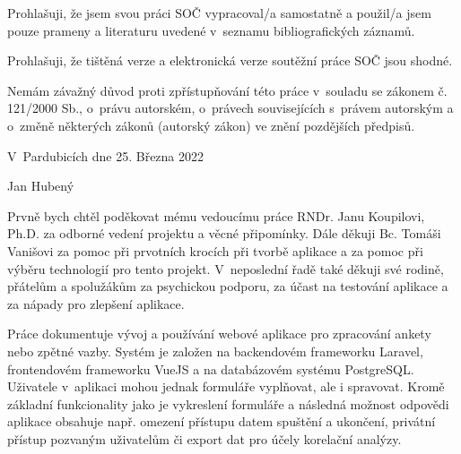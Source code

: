 
\noindent Prohlašuji, že jsem svou práci SOČ vypracoval/a samostatně a použil/a jsem pouze prameny a literaturu uvedené v~seznamu bibliografických záznamů.

\noindent Prohlašuji, že tištěná verze a elektronická verze soutěžní práce SOČ jsou shodné.

\noindent Nemám závažný důvod proti zpřístupňování této práce v~souladu se zákonem č. 121/2000 Sb., o~právu autorském, o~právech souvisejících s~právem autorským a o~změně některých zákonů (autorský zákon) ve znění pozdějších předpisů.  

\vspace{24 pt}

\noindent V~Pardubicích dne 25. Března 2022 \dotfill{} 

\hspace{8.5cm} Jan Hubený

\cleardoublepage

\vspace*{0.8\textheight}

\noindent
Prvně bych chtěl poděkovat mému vedoucímu práce RNDr. Janu Koupilovi, Ph.D. za odborné vedení projektu a věcné připomínky. Dále děkuji Bc. Tomáši Vanišovi za pomoc při prvotních krocích při tvorbě aplikace a za pomoc při výběru technologií pro tento projekt. V~neposlední řadě také děkuji své rodině, přátelům a spolužákům za psychickou podporu, za účast na testování aplikace a za nápady pro zlepšení aplikace.

\cleardoublepage


\noindent 
Práce dokumentuje vývoj a používání webové aplikace pro zpracování ankety nebo zpětné vazby. Systém je založen na backendovém frameworku Laravel, frontendovém frameworku VueJS a na databázovém systému PostgreSQL. Uživatele v~aplikaci mohou jednak formuláře vyplňovat, ale i spravovat. Kromě základní funkcionality jako je vykreslení formuláře a následná možnost odpovědi aplikace obsahuje např. omezení přístupu datem spuštění a ukončení, privátní přístup pozvaným uživatelům či export dat pro účely korelační analýzy.

\vspace{18pt}


